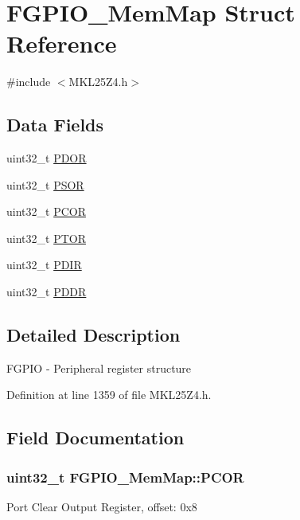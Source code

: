 \hypertarget{struct_f_g_p_i_o___mem_map}{}\section{F\+G\+P\+I\+O\+\_\+\+Mem\+Map Struct Reference}
\label{struct_f_g_p_i_o___mem_map}


{\ttfamily \#include $<$M\+K\+L25\+Z4.\+h$>$}

\subsection*{Data Fields}
\begin{DoxyCompactItemize}
\item 
uint32\+\_\+t \hyperlink{struct_f_g_p_i_o___mem_map_ab549d3ecd17467804bc780c97f83e034}{P\+D\+OR}
\item 
uint32\+\_\+t \hyperlink{struct_f_g_p_i_o___mem_map_a7179b85bd4a68dc196cb91b6433dd674}{P\+S\+OR}
\item 
uint32\+\_\+t \hyperlink{struct_f_g_p_i_o___mem_map_a3b37c7b24e8edd80c1cbc5282a4a8a3c}{P\+C\+OR}
\item 
uint32\+\_\+t \hyperlink{struct_f_g_p_i_o___mem_map_aa07e31d4362b7c29a10592d24511198c}{P\+T\+OR}
\item 
uint32\+\_\+t \hyperlink{struct_f_g_p_i_o___mem_map_af869762f9d42637f8fc09354e8947834}{P\+D\+IR}
\item 
uint32\+\_\+t \hyperlink{struct_f_g_p_i_o___mem_map_add5e56027e27e8a0076bf1c38fdcaed5}{P\+D\+DR}
\end{DoxyCompactItemize}


\subsection{Detailed Description}
F\+G\+P\+IO -\/ Peripheral register structure 

Definition at line 1359 of file M\+K\+L25\+Z4.\+h.



\subsection{Field Documentation}
\subsubsection[{\texorpdfstring{P\+C\+OR}{PCOR}}]{\setlength{\rightskip}{0pt plus 5cm}uint32\+\_\+t F\+G\+P\+I\+O\+\_\+\+Mem\+Map\+::\+P\+C\+OR}\hypertarget{struct_f_g_p_i_o___mem_map_a3b37c7b24e8edd80c1cbc5282a4a8a3c}{}\label{struct_f_g_p_i_o___mem_map_a3b37c7b24e8edd80c1cbc5282a4a8a3c}
Port Clear Output Register, offset\+: 0x8 

